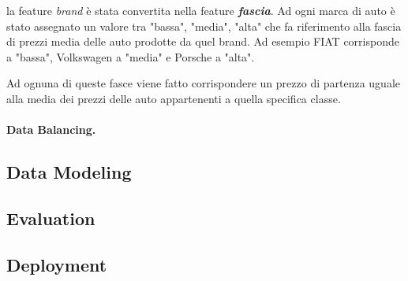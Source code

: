 \begin{itemize}
    la feature \textit{brand} è stata convertita nella feature \textit{\textbf{fascia}}. Ad ogni marca di auto è stato assegnato un valore tra "bassa", "media", "alta" che fa riferimento alla fascia di prezzi media delle auto prodotte da quel brand. Ad esempio FIAT corrisponde a "bassa", Volkswagen a "media" e Porsche a "alta".

    Ad ognuna di queste fasce viene fatto corrispondere un prezzo di partenza uguale alla media dei prezzi delle auto appartenenti a quella specifica classe.

    \begin{itemize}
    \renewcommand\labelitemi{\textbf{-}}
        
    \end{itemize}
    
\end{itemize}

\paragraph{Data Balancing.}


\subsection{Data Modeling}

\subsection{Evaluation}

\subsection{Deployment}
